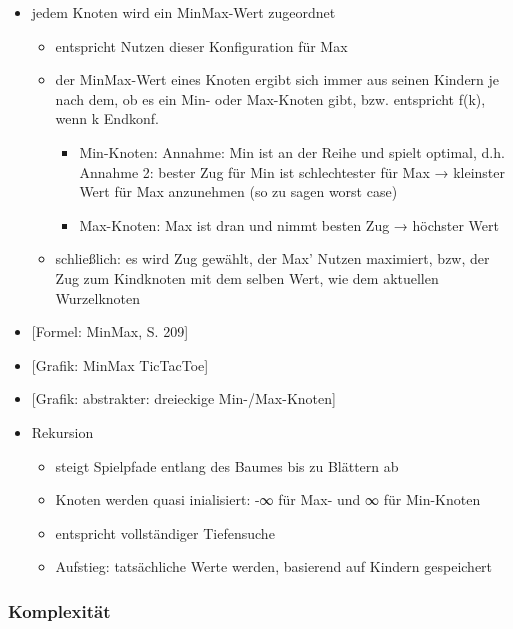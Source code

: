 \documentclass[]{article}
\begin{document}
\begin{itemize}
\item
  jedem Knoten wird ein MinMax-Wert zugeordnet

  \begin{itemize}
  \item
    entspricht Nutzen dieser Konfiguration für Max
  \item
    der MinMax-Wert eines Knoten ergibt sich immer aus seinen Kindern je
    nach dem, ob es ein Min- oder Max-Knoten gibt, bzw. entspricht f(k),
    wenn k Endkonf.

    \begin{itemize}
    \item
      Min-Knoten: Annahme: Min ist an der Reihe und spielt optimal, d.h.
      Annahme 2: bester Zug für Min ist schlechtester für Max →
      kleinster Wert für Max anzunehmen (so zu sagen worst case)
    \item
      Max-Knoten: Max ist dran und nimmt besten Zug → höchster Wert
    \end{itemize}
  \item
    schließlich: es wird Zug gewählt, der Max' Nutzen maximiert, bzw,
    der Zug zum Kindknoten mit dem selben Wert, wie dem aktuellen
    Wurzelknoten
  \end{itemize}
\item
  {[}Formel: MinMax, S. 209{]}
\item
  {[}Grafik: MinMax TicTacToe{]}
\item
  {[}Grafik: abstrakter: dreieckige Min-/Max-Knoten{]}
\item
  Rekursion

  \begin{itemize}
  \item
    steigt Spielpfade entlang des Baumes bis zu Blättern ab
  \item
    Knoten werden quasi inialisiert: -∞ für Max- und ∞ für Min-Knoten
  \item
    entspricht vollständiger Tiefensuche
  \item
    Aufstieg: tatsächliche Werte werden, basierend auf Kindern
    gespeichert
  \end{itemize}
\end{itemize}

\hypertarget{header-n1111}{%
\subsubsection{Komplexität}\label{header-n1111}}
\end{document}

